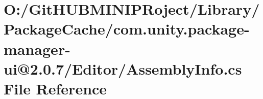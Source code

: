 \hypertarget{com_8unity_8package-manager-ui_0D2_80_87_2_editor_2_assembly_info_8cs}{}\section{O\+:/\+Git\+H\+U\+B\+M\+I\+N\+I\+P\+Roject/\+Library/\+Package\+Cache/com.unity.\+package-\/manager-\/ui@2.0.7/\+Editor/\+Assembly\+Info.cs File Reference}
\label{com_8unity_8package-manager-ui_0D2_80_87_2_editor_2_assembly_info_8cs}
